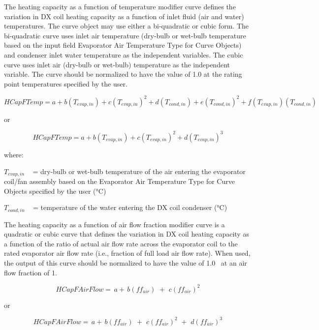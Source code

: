 The heating capacity as a function of temperature modifier curve defines the variation in DX coil heating capacity as a function of inlet fluid (air and water) temperatures. The curve object may use either a bi-quadratic or cubic form. The bi-quadratic curve uses inlet air temperature (dry-bulb or wet-bulb temperature based on the input field Evaporator Air Temperature Type for Curve Objects) and condenser inlet water temperature as the independent variables. The cubic curve uses inlet air (dry-bulb or wet-bulb) temperature as the independent variable. The curve should be normalized to have the value of 1.0 at the rating point temperatures specified by the user.

\begin{equation}
HCapFTemp = a + b\left( {{T_{evap,in}}} \right) + c{\left( {{T_{evap,in}}} \right)^2} + d\left( {{T_{cond,in}}} \right) + e{\left( {{T_{cond,in}}} \right)^2} + f\left( {{T_{evap,in}}} \right)\left( {{T_{cond,in}}} \right)
\end{equation}

or

\begin{equation}
HCapFTemp = a + b\left( {{T_{evap,in}}} \right) + c{\left( {{T_{evap,in}}} \right)^2} + d{\left( {{T_{evap,in}}} \right)^3}
\end{equation}

where:

\({T_{evap,in}}\) ~ = dry-bulb or wet-bulb temperature of the air entering the evaporator coil/fan assembly based on the Evaporator Air Temperature Type for Curve Objects specified by the user (°C)

\({T_{cond,in}}\) ~ = temperature of the water entering the DX coil condenser (°C)

The heating capacity as a function of air flow fraction modifier curve is a quadratic or cubic curve that defines the variation in DX coil heating capacity as a function of the ratio of actual air flow rate across the evaporator coil to the rated evaporator air flow rate (i.e., fraction of full load air flow rate). When used, the output of this curve should be normalized to have the value of 1.0~ at an air flow fraction of 1.

\begin{equation}
HCapFAirFlow = \,a + \,b\left( {f{f_{air}}} \right)\,\, + \,\,c{\left( {f{f_{air}}} \right)^2}
\end{equation}

or

\begin{equation}
HCapFAirFlow = \,a + \,b\left( {f{f_{air}}} \right)\,\, + \,\,c{\left( {f{f_{air}}} \right)^2}\,\, + \,\,d{\left( {f{f_{air}}} \right)^3}
\end{equation}

